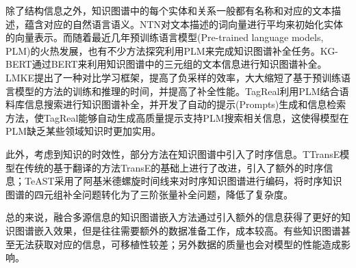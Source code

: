除了结构信息之外，知识图谱中的每个实体和关系一般都有名称和对应的文本描述，蕴含对应的自然语言语义。NTN对文本描述的词向量进行平均来初始化实体的向量表示。而随着最近几年预训练语言模型(Pre-trained language models, PLM)的火热发展，也有不少方法探究利用PLM来完成知识图谱补全任务。KG-BERT通过BERT来利用知识图谱中的三元组的文本信息进行知识图谱补全。LMKE提出了一种对比学习框架，提高了负采样的效率，大大缩短了基于预训练语言模型的方法的训练和推理的时间，并提高了补全性能。TagReal利用PLM结合语料库信息搜索进行知识图谱补全，并开发了自动的提示(Prompts)生成和信息检索方法，使TagReal能够自动生成高质量提示支持PLM搜索相关信息，这使得模型在PLM缺乏某些领域知识时更加实用。

此外，考虑到知识的时效性，部分方法在知识图谱中引入了时序信息。TTransE模型在传统的基于翻译的方法TransE的基础上进行了改进，引入了额外的时序信息；TeAST采用了阿基米德螺旋时间线来对时序知识图谱进行编码，将时序知识图谱的四元组补全问题转化为了三阶张量补全问题，降低了复杂度。

总的来说，融合多源信息的知识图谱嵌入方法通过引入额外的信息获得了更好的知识图谱嵌入效果，但是往往需要额外的数据准备工作，成本较高。有些知识图谱甚至无法获取对应的信息，可移植性较差；另外数据的质量也会对模型的性能造成影响。

